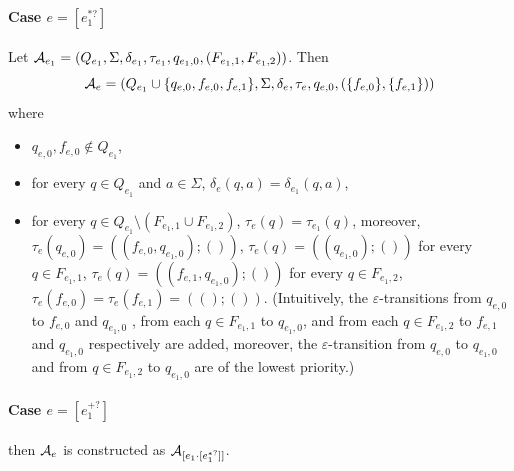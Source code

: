\paragraph{Case $e = [e_1^{\ast?}]$} Let $\mathcal{A}_{e_1} = (Q_{e_1}, \Sigma, \delta_{e_1}, \tau_{e_1}, q_{e_1,0}, (F_{e_1,1}, F_{e_1,2}))$. 
Then 
\[\mathcal{A}_e = (Q_{e_1} \cup \{q_{e,0}, f_{e,0}, f_{e,1}\}, \Sigma, \delta_e, \tau_e, q_{e,0}, (\{f_{e,0}\}, \{f_{e,1}\}))\]  
where 
		\begin{itemize}
			\item $q_{e,0}, f_{e,0} \not \in Q_{e_1}$,
			
			\item for every $q \in Q_{e_1}$ and $a \in \Sigma$, $\delta_e(q, a) = \delta_{e_1}(q, a)$, 
			
			\item for every $q \in Q_{e_1} \setminus (F_{e_1,1} \cup F_{e_1,2})$,  $\tau_e(q) = \tau_{e_1}(q)$, moreover, $\tau_e(q_{e,0}) = ((f_{e,0}, q_{e_1,0}); ())$,  $\tau_e(q) = ((q_{e_1,0});())$ for every $q \in F_{e_1,1}$, $\tau_e(q) = ((f_{e,1}, q_{e_1,0});())$ for every $q \in F_{e_1,2}$, $\tau_e(f_{e,0}) =\tau_e(f_{e,1}) = (();())$. (Intuitively, the $\varepsilon$-transitions from $q_{e,0}$ to $f_{e,0}$ and $q_{e_1,0}$ , from each $q \in F_{e_1,1}$ to  $q_{e_1,0}$, and from each $q \in F_{e_1,2}$ to $f_{e,1}$ and $q_{e_1,0}$ respectively are added, moreover, the $\varepsilon$-transition from $q_{e,0}$ to $q_{e_1,0}$ and from $q \in F_{e_1,2}$ to $q_{e_1,0}$ are of the lowest priority.)
		\end{itemize}

 
\paragraph{Case $e = [e_1^{+?}]$} then $\mathcal{A}_e$ is constructed as $\mathcal{A}_{[e_1 \cdot [e_1^{*?}]]}$.

